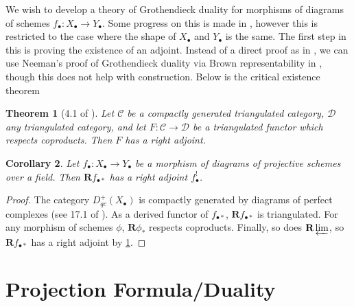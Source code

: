 \documentclass{report}
\newtheorem{theorem}{Theorem}[section]
\newtheorem{cor}[theorem]{Corollary}
\theoremstyle{definition}
\newcommand{\CL}{\mathcal{C}}
\newcommand{\DD}{\mathcal{D}}
\newcommand{\bR}{\textbf{R}}
\begin{document}
We wish to develop a theory of Grothendieck duality for morphisms of diagrams of schemes $f_\bullet : X_\bullet \rightarrow Y_\bullet$.
Some progress on this is made in \cite{Lipman2009}, however this is restricted to the case where the shape of $X_\bullet$ and $Y_\bullet$ is the same.
The first step in this is proving the existence of an adjoint.
Instead of a direct proof as in \cite{Hartshorne1966}, we can use Neeman's proof of Grothendieck duality via Brown representability in \cite{Neeman1996}, though this does not help with construction.
Below is the critical existence theorem

\begin{theorem}[4.1 of \cite{Neeman1996}]
	\label{thm:neeman4.1}
	Let $\CL$ be a compactly generated triangulated category, $\DD$ any triangulated category, and let $F : \CL \rightarrow \DD$ be a triangulated functor which respects coproducts.
	Then $F$ has a right adjoint.
\end{theorem}

\begin{cor}
	Let $f_\bullet : X_\bullet \rightarrow Y_\bullet$ be a morphism of diagrams of projective schemes over a field.
	Then $\bR f_{\bullet *}$ has a right adjoint $f^!_\bullet$.
\end{cor}
\begin{proof}
	The category $D_{qc}^+(X_\bullet)$ is compactly generated by diagrams of perfect complexes (see 17.1 of \cite{Lipman2009}).
	As a derived functor of $f_{\bullet *}$, $\bR f_{\bullet *}$ is triangulated.
	For any morphism of schemes $\phi$, $\bR \phi_*$ respects coproducts.
	Finally, so does $\bR \varprojlim$, so $\bR f_{\bullet *}$ has a right adjoint by \ref{thm:neeman4.1}.
\end{proof}


\section{Projection Formula/Duality}
\end{document}
